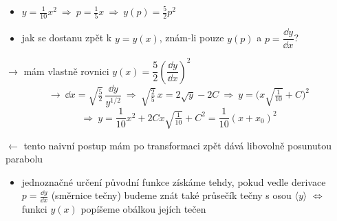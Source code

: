 \begin{priklad}[Př:]
\begin{itemize}
  \item $y = \frac{1}{10}x^2 \ \Rightarrow\ p = \frac15x \ \Rightarrow\ y(p) = \frac52p^2$
  \item jak se dostanu zpět k $y = y(x)$, znám-li pouze $y(p)$ a $p = \dfrac{\dd y}{\dd x}$?
\end{itemize}
$\to$ mám vlastně rovnici \quad $y(x) = \dfrac52\left(\dfrac{\dd y}{\dd x}\right)^2$
\[
  \to\ \dd x = \sqrt{\tfrac52}\,\frac{\dd y}{y^{1/2}}
  \ \Rightarrow\ \sqrt{\tfrac25}\,x = 2\sqrt y - 2C
  \ \Rightarrow\ y = \Big(x\sqrt{\tfrac{1}{10}} + C\Big)^2
\]
\[
  \Rightarrow\ y = \frac1{10}x^2 + 2Cx\sqrt{\tfrac1{10}} + C^2 = \frac{1}{10}(x + x_0)^2
\]

\begin{minipage}{0.45\textwidth}
\end{minipage}
\begin{minipage}{0.5\textwidth}
$\leftarrow$ tento naivní postup mám po transformaci zpět dává libovolně posunutou parabolu
\end{minipage}
\end{priklad}

\begin{itemize}
  \item jednoznačné určení původní funkce získáme tehdy, pokud vedle derivace $p = \frac{\dd y}{\dd x}$ (směrnice tečny) budeme znát také průsečík tečny s osou $\langle y\rangle$ $\Leftrightarrow$ funkci $y(x)$ popíšeme obálkou jejích tečen
\end{itemize}

